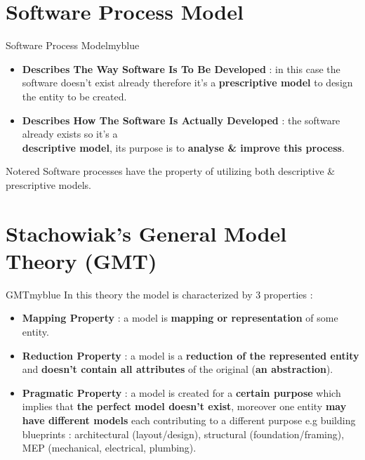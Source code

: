 \documentclass{report}
\begin{document}
\vspace{0.25cm}
\section{Software Process Model}
\begin{prettyBox}{Software Process Model}{myblue}
    \begin{itemize}
        \item \textbf{Describes The Way Software Is To Be Developed} : in this case the software doesn't exist already
            therefore it's a \textbf{prescriptive model} to design the entity to be created.
        \item \textbf{Describes How The Software Is Actually Developed} : the software already exists so it's a\\ 
            \textbf{descriptive model}, its purpose is to \textbf{analyse \& improve this process}.
    \end{itemize}
\end{prettyBox}

\vspace{0.15cm}

\begin{prettyBox}{Note}{red}
    Software processes have the property of utilizing both descriptive \& prescriptive models.
\end{prettyBox}


\vspace{0.25cm}

\section{Stachowiak's General Model Theory (GMT)}
\begin{prettyBox}{GMT}{myblue}
In this theory the model is characterized by 3 properties :
    \begin{itemize}
        \item \textbf{Mapping Property} : a model is \textbf{mapping or representation} of some entity.
        \item \textbf{Reduction Property} : a model is a \textbf{reduction of the represented entity} and 
            \textbf{doesn't contain all attributes} of the original (\textbf{an abstraction}).
        \item \textbf{Pragmatic Property} : a model is created for a \textbf{certain purpose} which implies that 
            \textbf{the perfect model doesn't exist}, moreover one entity \textbf{may have different models} each 
            contributing to a different purpose e.g building blueprints : architectural (layout/design), structural (foundation/framing), MEP (mechanical, electrical, plumbing).
    \end{itemize}    
\end{prettyBox}
\end{document}
